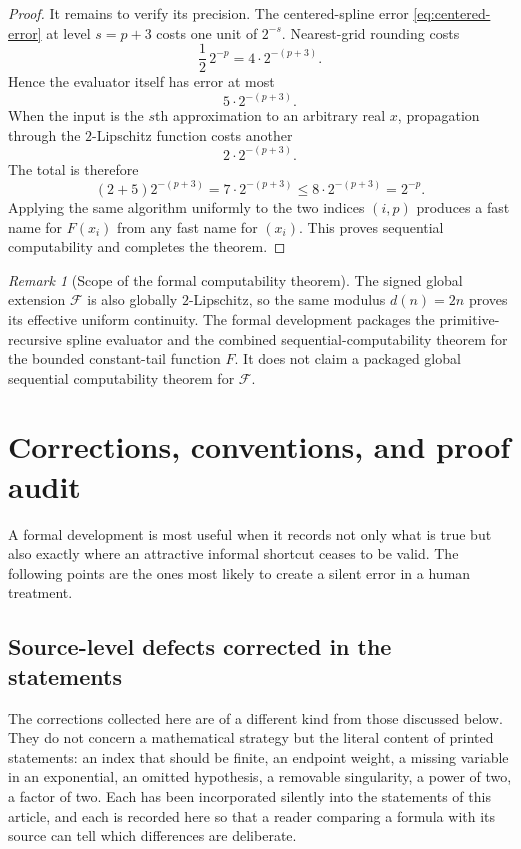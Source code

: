 \documentclass[11pt,oneside]{article}
\theoremstyle{definition}
\theoremstyle{remark}
\newtheorem{remark}[theorem]{Remark}
\begin{document}
\begin{proof}
It remains to verify its precision.  The centered-spline error
\eqref{eq:centered-error} at level $s=p+3$ costs one unit of $2^{-s}$.
Nearest-grid rounding costs
\[
 \frac12\,2^{-p}=4\cdot2^{-(p+3)}.
\]
Hence the evaluator itself has error at most
\begin{equation}
 5\cdot2^{-(p+3)}.                                       \label{eq:evaluator-five-units}
\end{equation}
When the input is the $s$th approximation to an arbitrary real $x$, propagation through
the $2$-Lipschitz function costs another
\[
 2\cdot2^{-(p+3)}.
\]
The total is therefore
\[
 (2+5)2^{-(p+3)}
 =7\cdot2^{-(p+3)}
 \le8\cdot2^{-(p+3)}
 =2^{-p}.
\]
Applying the same algorithm uniformly to the two indices $(i,p)$ produces a fast name for
$F(x_i)$ from any fast name for $(x_i)$.  This proves sequential computability and completes
the theorem.
\end{proof}

\begin{remark}[Scope of the formal computability theorem]
The signed global extension $\mathcal F$ is also globally $2$-Lipschitz, so the same modulus
$d(n)=2n$ proves its effective uniform continuity.  The formal development packages the
primitive-recursive spline evaluator and the combined sequential-computability theorem for
the bounded constant-tail function $F$.  It does not claim a packaged global sequential
computability theorem for $\mathcal F$.
\end{remark}

\section{Corrections, conventions, and proof audit}
\label{sec:audit}

A formal development is most useful when it records not only what is true but also exactly
where an attractive informal shortcut ceases to be valid.  The following points are the
ones most likely to create a silent error in a human treatment.


\subsection{Source-level defects corrected in the statements}
\label{sec:aud-source-defects}

The corrections collected here are of a different kind from those discussed below.  They do
not concern a mathematical strategy but the literal content of printed statements: an index
that should be finite, an endpoint weight, a missing variable in an exponential, an omitted
hypothesis, a removable singularity, a power of two, a factor of two.  Each has been
incorporated silently into the statements of this article, and each is recorded here so that
a reader comparing a formula with its source can tell which differences are deliberate.
\end{document}
